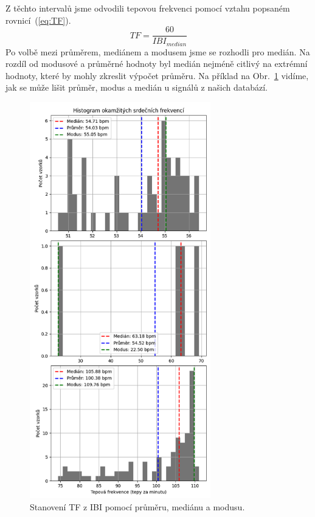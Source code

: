 Z těchto intervalů jsme odvodili tepovou frekvenci pomocí vztahu popsaném rovnicí~(\ref{eq:TF}).
\begin{equation}
	\label{eq:TF}
	TF = \frac{60}{IBI_{median}}
\end{equation}
Po volbě mezi průměrem, mediánem a modusem jsme se rozhodli pro medián.
Na rozdíl od modusové a průměrné hodnoty byl medián nejméně citlivý na extrémní hodnoty, které by mohly zkreslit výpočet průměru.
Na příklad na Obr.~\ref{fig:HR_hist} vidíme, jak se může lišit průměr, modus a medián u signálů z našich databází.

\begin{figure}[b]
	\label{fig:HR_hist}
	\centering
	\includegraphics[width=0.7\textwidth]{./obrazky/HR_Hist.png}
	\caption[Histogram IBI]{Stanovení TF z IBI pomocí průměru, mediánu a modusu.}
	\vspace{-5mm}
\end{figure}

